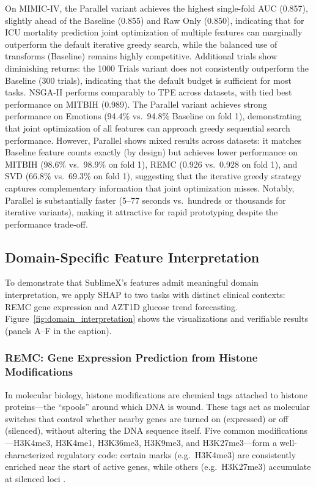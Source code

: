\documentclass[times, review, 10pt]{elsarticle}
\begin{document}
On MIMIC-IV, the Parallel variant achieves the highest single-fold AUC (0.857), slightly ahead of the
Baseline (0.855) and Raw Only (0.850), indicating that for ICU mortality prediction joint optimization
of multiple features can marginally outperform the default iterative greedy search, while the balanced
use of transforms (Baseline) remains highly competitive. 
Additional trials show diminishing returns: the 1000 Trials variant does not consistently outperform the Baseline (300 trials), indicating
that the default budget is sufficient for most tasks. NSGA-II performs
comparably to TPE across datasets, with tied best performance on MITBIH
(0.989). The Parallel variant achieves strong performance on Emotions (94.4\%
vs.\ 94.8\% Baseline on fold 1), demonstrating that joint optimization of all
features can approach greedy sequential search performance. However, Parallel
shows mixed results across datasets: it matches Baseline feature counts exactly
(by design) but achieves lower performance on MITBIH (98.6\% vs.\ 98.9\% on
fold 1), REMC (0.926 vs.\ 0.928 on fold 1), and SVD (66.8\% vs.\ 69.3\% on
fold 1), suggesting that the iterative greedy strategy captures complementary
information that joint optimization misses. Notably, Parallel is substantially
faster (5--77 seconds vs.\ hundreds or thousands for iterative variants),
making it attractive for rapid prototyping despite the performance trade-off.

\subsection{Domain-Specific Feature Interpretation}
\label{sec:domain_interpretation}

To demonstrate that SublimeX's features admit meaningful
domain interpretation, we apply SHAP \cite{lundberg2017unified} to two tasks
with distinct clinical contexts: REMC gene expression and AZT1D glucose
trend forecasting. Figure~\ref{fig:domain_interpretation} shows the
visualizations and verifiable results (panels A--F in the caption).

\subsubsection{REMC: Gene Expression Prediction from
Histone Modifications}

In molecular biology, histone modifications are chemical
tags attached to histone proteins---the ``spools'' around
which DNA is wound. These tags act as molecular switches
that control whether nearby genes are turned on (expressed)
or off (silenced), without altering the DNA sequence itself.
Five common modifications---H3K4me3, H3K4me1, H3K36me3,
H3K9me3, and H3K27me3---form a well-characterized
regulatory code: certain marks (e.g.\ H3K4me3) are
consistently enriched near the start of active genes,
while others (e.g.\ H3K27me3) accumulate at silenced loci
\cite{karlic2010histone, howe2017h3k4me3}.
\end{document}
